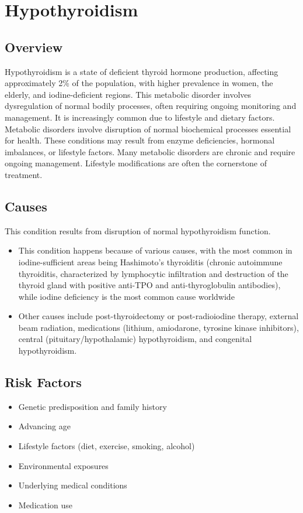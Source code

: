 \chapter{Hypothyroidism}
\label{sec:Hypothyroidism}

\section{Overview}
Hypothyroidism is a state of deficient thyroid hormone production, affecting approximately 2\% of the population, with higher prevalence in women, the elderly, and iodine-deficient regions. This metabolic disorder involves dysregulation of normal bodily processes, often requiring ongoing monitoring and management. It is increasingly common due to lifestyle and dietary factors. Metabolic disorders involve disruption of normal biochemical processes essential for health. These conditions may result from enzyme deficiencies, hormonal imbalances, or lifestyle factors. Many metabolic disorders are chronic and require ongoing management. Lifestyle modifications are often the cornerstone of treatment.
\section{Causes}
This condition results from disruption of normal hypothyroidism function.

\begin{itemize}[noitemsep]
  \item This condition happens because of various causes, with the most common in iodine-sufficient areas being Hashimoto's thyroiditis (chronic autoimmune thyroiditis, characterized by lymphocytic infiltration and destruction of the thyroid gland with positive anti-TPO and anti-thyroglobulin antibodies), while iodine deficiency is the most common cause worldwide
  \item Other causes include post-thyroidectomy or post-radioiodine therapy, external beam radiation, medications (lithium, amiodarone, tyrosine kinase inhibitors), central (pituitary/hypothalamic) hypothyroidism, and congenital hypothyroidism.
\end{itemize}
\section{Risk Factors}
\begin{itemize}[noitemsep]
  \item Genetic predisposition and family history
  \item Advancing age
  \item Lifestyle factors (diet, exercise, smoking, alcohol)
  \item Environmental exposures
  \item Underlying medical conditions
  \item Medication use
\end{itemize}
